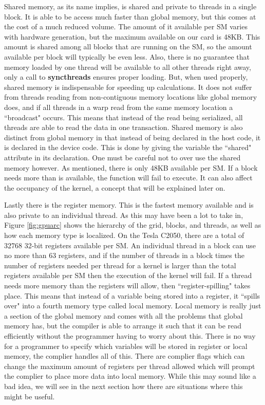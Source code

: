 \documentclass[12pt]{report}
\newcommand{\comm}[1]{\textbf{#1}}
\begin{document}
Shared memory, as its name implies, is shared and private to threads in a single block. It is able to be access much faster than global memory, but this comes at the cost of a much reduced volume. The amount of it available per SM varies with hardware generation, but the maximum available on our card is 48KB. This amount is shared among all blocks that are running on the SM, so the amount available per block will typically be even less. Also, there is no guarantee that memory loaded by one thread will be available to all other threads right away, only a call to \comm{syncthreads} ensures proper loading. But, when used properly, shared memory is indispensable for speeding up calculations. It does not suffer from threads reading from non-contiguous memory locations like global memory does, and if all threads in a warp read from the same memory location a ``broadcast" occurs. This means that instead of the read being serialized, all threads are able to read the data in one transaction. Shared memory is also distinct from global memory in that instead of being declared in the host code, it is declared in the device code. This is done by giving the variable the ``shared" attribute in its declaration. One must be careful not to over use the shared memory however. As mentioned, there is only 48KB available per SM. If a block needs more than is available, the function will fail to execute. It can also affect the occupancy of the kernel, a concept that will be explained later on.

Lastly there is the register memory. This is the fastest memory available and is also private to an individual thread. As this may have been a lot to take in, Figure \ref{fig:gpuarc} shows the hierarchy of the grid, blocks, and threads, as well as how each memory type is localized. On the Tesla C2050, there are a total of 32768 32-bit registers available per SM. An individual thread in a block can use no more than 63 registers, and if the number of threads in a block times the number of registers needed per thread for a kernel is larger than the total registers available per SM then the execution of the kernel will fail. If a thread needs more memory than the registers will allow, then ``register-spilling" takes place. This means that instead of a variable being stored into a register, it ``spills over" into a fourth memory type called local memory. Local memory is really just a section of the global memory and comes with all the problems that global memory has, but the compiler is able to arrange it such that it can be read efficiently without the programmer having to worry about this. There is no way for a programmer to specify which variables will be stored in register or local memory, the complier handles all of this. There are complier flags which can change the maximum amount of registers per thread allowed which will prompt the complier to place more data into local memory. While this may sound like a bad idea, we will see in the next section how there are situations where this might be useful.
\end{document}
